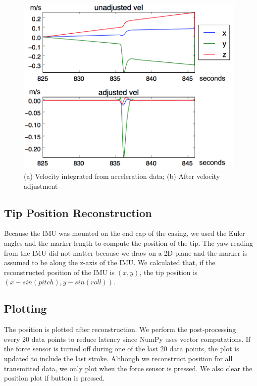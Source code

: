 \documentclass[10pt,journal]{IEEEtran}
\begin{document}
\begin{figure}[h]
    \includegraphics[width=\linewidth]{figures/vel-adjust}
  \caption{(a) Velocity integrated from acceleration data; (b) After velocity adjustment}
  \label{fig:vel-adjust}
\end{figure}

\subsection{Tip Position Reconstruction}
Because the IMU was mounted on the end cap of the casing, we used the Euler angles and the marker length to compute the position of the tip. The yaw reading from the IMU did not matter because we draw on a 2D-plane and the marker is assumed to be along the z-axis of the IMU. We calculated that, if the reconstructed position of the IMU is $(x,y)$, the tip position is $(x-sin(pitch), y-sin(roll))$.

\subsection{Plotting}
  The position is plotted after reconstruction. We perform the post-processing every 20 data points to reduce latency since NumPy uses vector computations. If the force sensor is turned off during one of the last 20 data points, the plot is updated to include the last stroke. Although we reconstruct position for all transmitted data, we only plot when the force sensor is pressed. We also clear the position plot if button is pressed. 
\end{document}

